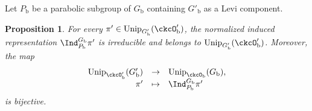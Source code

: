 \documentclass[12pt,a4paper]{amsart}
\newcommand{\be}{\begin {equation}}
\newcommand{\ee}{\end {equation}}
\numberwithin{equation}{section}
\newtheorem{prop}[thm]{Proposition}
\theoremstyle{remark}
\def\Unip{\mathrm{Unip}}
\def\ckcOb{\ckcO_{\mathrm b}}
\def\ckcOpb{\ckcO'_{\mathrm b}}
\def\Gb{G_{\mathrm b}}
\def\Gpb{G'_{\mathrm b}}
\def\Pb{P_{\mathrm b}}
\begin{document}
Let $P_{\mathrm b}$ be a parabolic subgroup of $G_{\mathrm b}$ containing  $G'_{\mathrm b}$ as a Levi
component.




\def\fIb{\fI_{\mathrm b}}
\def\pib{\pi_{\mathrm b}}


\begin{prop}\label{lem:Unip.BP}
For every $\pi'\in \Unip_{\Gpb}(\ckcOpb)$, the normalized induced representation
$\Ind_{\Pb}^{\Gb}\pi'$ is irreducible and belongs to $\Unip_{\Gpb}(\ckcOpb)$.
Moreover, the map
  \be\label{badind}
    \begin{array}{rcl}
      \Unip_{\ckcO'_{\mathrm b}}(G'_{\mathrm b}) & \rightarrow & \Unip_{\ckcOb}(\Gb), \\
      \pi' & \mapsto & %
                        \Ind_{\Pb}^{\Gb}\pi'
    \end{array}
  \ee
  is bijective.
\end{prop}
\end{document}
